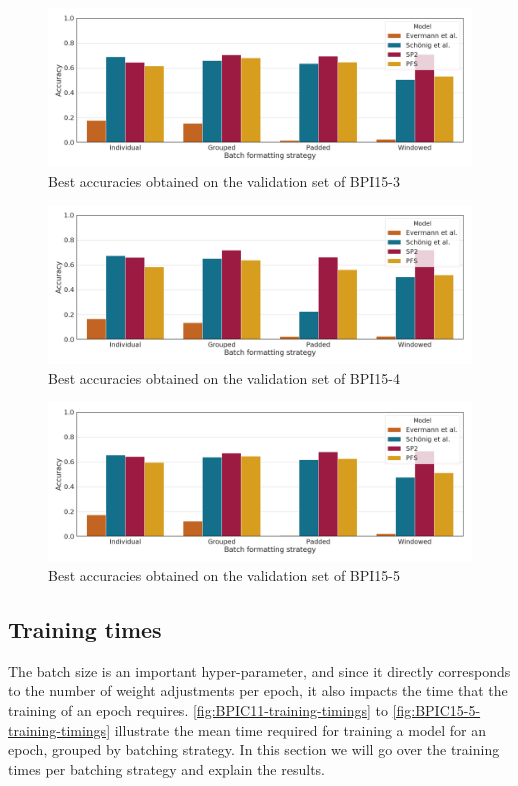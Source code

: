 \begin{figure}
    \centering
    \includegraphics[width=\textwidth]{gfx/bpic2015_3/accuracies.png}
    \caption{Best accuracies obtained on the validation set of BPI15-3}
    \label{fig:max-accuracies-bpic2015-3}
\end{figure}
\begin{figure}
    \centering
    \includegraphics[width=\textwidth]{gfx/bpic2015_4/accuracies.png}
    \caption{Best accuracies obtained on the validation set of BPI15-4}
    \label{fig:max-accuracies-bpic2015-4}
\end{figure}
\begin{figure}
    \centering
    \includegraphics[width=\textwidth]{gfx/bpic2015_5/accuracies.png}
    \caption{Best accuracies obtained on the validation set of BPI15-5}
    \label{fig:max-accuracies-bpic2015-5}
\end{figure}
\FloatBarrier

\subsection*{Training times}
The batch size is an important hyper-parameter, and since it directly corresponds to the number of weight adjustments per epoch, it also impacts the time that the training of an epoch requires. \autoref{fig:BPIC11-training-timings} to \autoref{fig:BPIC15-5-training-timings} illustrate the mean time required for training a model for an epoch, grouped by batching strategy.
In this section we will go over the training times per batching strategy and explain the results.

